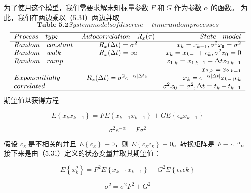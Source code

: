 		 为了使用这个模型，我们需要求解未知标量参数 $ F $ 和 $ G $ 作为参数  $ \alpha $ 的函数。 为此，我们在两边乘以（5.31）两边并取
		\[ \textbf{Table 5.2} System models of discrete-time random processes  \]
		\[ \begin{tabular}{lcr}
		\hline
		$ Process\quad type $ & $ Autocorrelation\quad R_{x}(\tau) $ & $State\quad model $ \\
		\cline{1-3}
		$ Random \quad constant $ & $  R_{x}(\Delta t)=\sigma^{2}$ & $  x_{k}=x_{k-1},\sigma^{2}{x_{0}}=\sigma^{2}$\\
		$ Random \quad walk $&$  R_{x}(\Delta t)= \infty  $&$  x_{k}=x_{k-1}+\epsilon_{k},\sigma^{2}{x_{0}}=0$\\
		
		$ Random \quad ramp $ &$ \quad$&$  x_{1,k}=x_{1,k-1}+\Delta t x_{2,k-1}$\\
		
		$  \quad  $ &$ \quad$&$  x_{2,k}=x_{2,k-1} $\\
		
		$  Exponenitially  $  & $ R_{x}(\Delta t)=\sigma^{2}e^{-\alpha|\Delta t_{k}|} $ & $ x_{k}=e^{-\alpha|\Delta t|}x_{k-1}\epsilon_{k}$\\
		
		$ correlated$ & $  \quad   $ & $ \sigma^{2}{x_{0}}=\sigma^{2},\Delta t = t_{k}-t_{k-1} $ \\
		
		\hline
		\end{tabular} \]      
		 期望值以获得方程
		 
		 \[ E\left\lbrace x_{k}x_{k-1} \right\rbrace =FE\left\lbrace x_{k-1}x_{k-1}\right\rbrace +GE\left\lbrace \epsilon_{k}x_{k-1}\right\rbrace \]
		 
		 \begin{equation}\label{5.32}
		 \sigma^{2}e^{-\alpha}=F\sigma^{2}
		 \end{equation}
		 
		 假设 $ \varepsilon_{k} $ 是不相关的并且 $ E\left\lbrace \varepsilon_{k}\right\rbrace =0 $，则 $ E\left\lbrace \varepsilon_{k}\varepsilon_{k} \right\rbrace = 0 $。转换矩阵是 $ F=e^{-\alpha} $。接下来是由（5.31）定义的状态变量并取其期望值：
		 
		 \[ E\left\lbrace x_{k}^{2}\right\rbrace = F^{2}E\left\lbrace x_{k-1}x_{k-1}\right\rbrace+G^{2}E\left\lbrace \epsilon_{k}\epsilon{k}\right\rbrace \]
		 
		\begin{equation}\label{5.33}
		\sigma^{2}=\sigma^{2}F^{2}+G^{2}
		\end{equation}
		 
